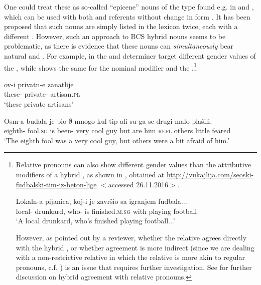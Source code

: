 \documentclass[output=paper,modfonts,newtxmath,hidelinks]{langscibook}
\begin{document}
\noindent One could treat these as so-called ``epicene'' nouns of the type found e.g. in  and , which can be used with both  and  referents without change in form \citep{bobaljikzocca,merchant14,kramerbook}.
 It has been proposed that such nouns are simply listed in the lexicon twice, each with a different  \citep[e.g.][19]{merchant14}. However, such an approach to BCS hybrid nouns seems to be problematic, as there is evidence that these nouns can \textit{simultaneously} bear natural and . 
 For example, in  the  and determiner target different gender values of the , while  shows the same for the nominal modifier and the .\footnote{Relative pronouns can also show different gender values than the attributive modifiers of a hybrid , as shown in , obtained at \url{http://vukajlija.com/seoski-fudbalski-tim-iz-beton-lige} $<$accessed 26.11.2016$>$.
 
\ea \gll Lokaln-a pijanica, koj-i je završio sa igranjem fudbala...\\
	local- drunkard, who- is finished.\textsc{m.sg} with playing football\\
	\glt `A local drunkard, who's finished playing football...'\label{14:exfn1i}
    \z

\noindent However, as pointed out by a reviewer, whether the relative  agrees directly with the hybrid , or whether agreement is more indirect (since we are dealing with a non-restrictive relative  in which the relative  is more akin to regular pronouns, c.f. \citealt{devries06}) is an issue that requires further investigation. See \citet{arsenijevicjuksek} for further discussion on hybrid agreement with relative pronouns.}	

	\ea \gll ov-i privatn-e zanatlije\label{14:mismatchbcs}\\
	these- private- artisan.\textsc{pl}\\
	\glt `these private artisans'\hfill \citep[206]{corbett06}\label{14:ex3}
    \z
	
	\ea \gll Osm-a budala je bio-$\emptyset$ mnogo kul tip ali su ga se drugi malo plašili.\footnotemark\\
	eighth- fool.\textsc{sg} is been- very cool guy but are him \textsc{refl} others little feared\\
	\glt `The eighth fool was a very cool guy, but others were a bit afraid of him.'\label{14:ex4}
    \z
 
\end{document}
